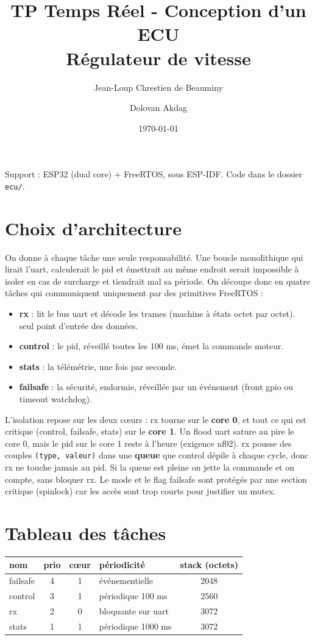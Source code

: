 \documentclass[a4paper,11pt]{article}
\title{\textbf{TP Temps Réel - Conception d'un ECU\\Régulateur de vitesse}}
\author{Jean-Loup Chrestien de Beauminy \and Dolovan Akdag}
\date{\today}
\begin{document}
\maketitle

\noindent
Support : ESP32 (dual core) + FreeRTOS, sous ESP-IDF. Code dans le dossier \texttt{ecu/}.

\section{Choix d'architecture}

On donne à chaque tâche une seule responsabilité. Une boucle monolithique qui
lirait l'uart, calculerait le pid et émettrait au même endroit serait impossible
à isoler en cas de surcharge et tiendrait mal sa période. On découpe donc en
quatre tâches qui communiquent uniquement par des primitives FreeRTOS :

\begin{itemize}
    \item \textbf{rx} : lit le bus uart et décode les trames (machine à états
    octet par octet). seul point d'entrée des données.
    \item \textbf{control} : le pid, réveillé toutes les 100 ms, émet la commande moteur.
    \item \textbf{stats} : la télémétrie, une fois par seconde.
    \item \textbf{failsafe} : la sécurité, endormie, réveillée par un événement
    (front gpio ou timeout watchdog).
\end{itemize}

L'isolation repose sur les deux cœurs : rx tourne sur le \textbf{core 0}, et tout
ce qui est critique (control, failsafe, stats) sur le \textbf{core 1}. Un flood
uart sature au pire le core 0, mais le pid sur le core 1 reste à l'heure
(exigence nf02). rx pousse des couples \texttt{(type, valeur)} dans une
\textbf{queue} que control dépile à chaque cycle, donc rx ne touche jamais au pid.
Si la queue est pleine on jette la commande et on compte, sans bloquer rx. Le mode
et le flag failsafe sont protégés par une section critique (spinlock) car les
accès sont trop courts pour justifier un mutex.

\section{Tableau des tâches}

\begin{center}
\begin{tabular}{|l|c|c|l|c|}
\hline
\textbf{nom} & \textbf{prio} & \textbf{cœur} & \textbf{périodicité} & \textbf{stack (octets)} \\
\hline
failsafe & 4 & 1 & événementielle & 2048 \\
control  & 3 & 1 & périodique 100 ms & 2560 \\
rx       & 2 & 0 & bloquante sur uart & 3072 \\
stats    & 1 & 1 & périodique 1000 ms & 3072 \\
\hline
\end{tabular}
\end{center}
\end{document}
